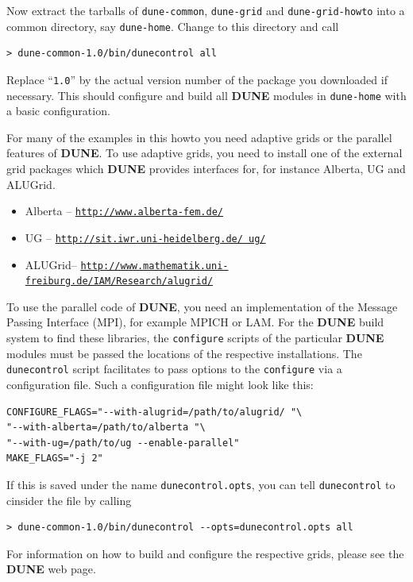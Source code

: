 \documentclass[11pt,a4paper,headinclude,footinclude,DIV16,normalheadings]{scrreprt}
\newcommand{\Dune}{{\sf\bfseries DUNE}\xspace}
\begin{document}
Now extract the tarballs of \texttt{dune-common}, \texttt{dune-grid}
and \texttt{dune-grid-howto} into a common directory, say
\texttt{dune-home}.  Change to this directory and call
\begin{lstlisting}
> dune-common-1.0/bin/dunecontrol all
\end{lstlisting}
Replace ``\texttt{1.0}'' by the actual version number of the package
you downloaded if necessary.  This should configure and build all
\Dune{} modules in \texttt{dune-home} with a basic configuration.

For many of the examples in this howto you need adaptive grids or the
parallel features of \Dune{}.  To use adaptive grids, you need to
install one of the external grid packages which \Dune{} provides
interfaces for, for instance Alberta, UG and ALUGrid.
\begin{itemize}
\item Alberta -- \href{http://www.alberta-fem.de/}{\texttt{http://www.alberta-fem.de/}}
\item UG -- \href{http://sit.iwr.uni-heidelberg.de/~ug/}{\texttt{http://sit.iwr.uni-heidelberg.de/~ug/}}
\item ALUGrid-- \href{http://www.mathematik.uni-freiburg.de/IAM/Research/alugrid/}{\texttt{http://www.mathematik.uni-freiburg.de/IAM/Research/alugrid/}}
\end{itemize}
To use the parallel code of \Dune{}, you need an implementation of the
Message Passing Interface (MPI), for example MPICH or LAM.  For the
\Dune{} build system to find these libraries, the \texttt{configure}
scripts of the particular \Dune{} modules must be passed the locations
of the respective installations.  The \texttt{dunecontrol} script
facilitates to pass options to the \texttt{configure} via a
configuration file.  Such a configuration file might look like this:
\begin{lstlisting}
CONFIGURE_FLAGS="--with-alugrid=/path/to/alugrid/ "\
"--with-alberta=/path/to/alberta "\
"--with-ug=/path/to/ug --enable-parallel"
MAKE_FLAGS="-j 2"
\end{lstlisting}
If this is saved under the name \texttt{dunecontrol.opts}, you
can tell \texttt{dunecontrol} to cinsider the file by calling
\begin{lstlisting}
> dune-common-1.0/bin/dunecontrol --opts=dunecontrol.opts all
\end{lstlisting}

For information on how to build and configure the respective grids,
please see the \Dune{} web page.
\end{document}
